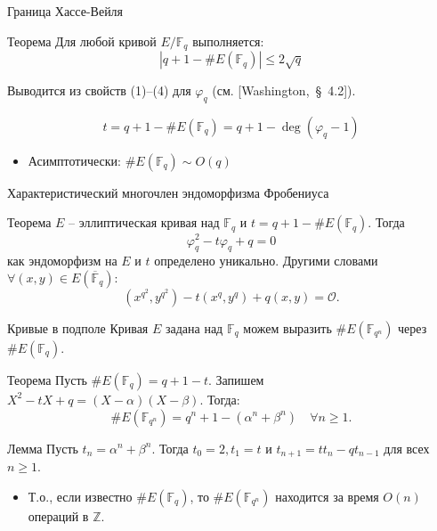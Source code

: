 \documentclass{beamer}
\begin{document}
\begin{frame}{Граница Хассе-Вейля} 
\begin{block}{Теорема} Для любой кривой $E/\mathbb{F}_q$ выполняется:
\[
| {q + 1 - \# E( {{\mathbb{F}_q}} )} | \leqslant 2\sqrt q 
\]
\end{block}
\structure{$\triangleleft$}
Выводится из свойств (1)--(4) для ${\varphi _q}$ (см. [Washington,~\S~4.2]). 
\structure{$\triangleright$}

\vspace{1em}

\[t  = q + 1 - \# E( {{\mathbb{F}_q}} ) = q + 1 - \deg ( {\varphi_q - 1} )\]

\begin{itemize}
    \item Асимптотически: $\# E(\mathbb{F}_q) \sim O(q)$
\end{itemize}
\end{frame}

\begin{frame}{Характеристический многочлен эндоморфизма Фробениуса}
\begin{block}{Теорема}
$E$ -- эллиптическая кривая над $\mathbb{F}_q$ и $t = q + 1 - \# E(\mathbb{F}_q)$. Тогда 
\[
\varphi _q^2 - t \varphi _q + q = 0
\]
как эндоморфизм на $E$ и $t$ определено уникально. Другими словами $\forall ( {x,y} ) \in E( \overline{\mathbb{F}}_q ):$
\begin{equation*}
(x^{q^2}, y^{q^2}) - t (x^q, y^q) + q(x,y) = \mathcal{O}.
\end{equation*}
\end{block}
\end{frame}

\begin{frame}{Кривые в подполе}
Кривая $E$ задана над $\mathbb{F}_q$ \structure{$\implies$} можем выразить $\# E(\mathbb{F}_{q^n})$ через $\# E( \mathbb{F}_q )$.

\begin{block}{Теорема}
Пусть $\# E( {{\mathbb{F}_q}} ) = q + 1 - t$. Запишем {\footnotesize $X^2 - t X + q = (X - \alpha)(X - \beta)$}. Тогда: 
$$
\# E(\mathbb{F}_{q^n}) = {q^n} + 1 - ( \alpha^n+ \beta ^n )\quad \forall n \geqslant 1.
$$
\end{block}

\begin{block}{Лемма}
Пусть $t_n = \alpha^n + \beta^n$. Тогда $t_0 = 2, t_1 = t$ и $t_{n+1} = t t_n - q t_{n-1}$ для всех $n \geq 1$.
\end{block}

\begin{itemize}
    \item Т.о., если известно $\#E(\mathbb{F}_q)$, то $\#E(\mathbb{F}_{q^n})$ находится за время $O(n)$ операций в $\mathbb{Z}$.
\end{itemize}
\end{frame}
\end{document}
